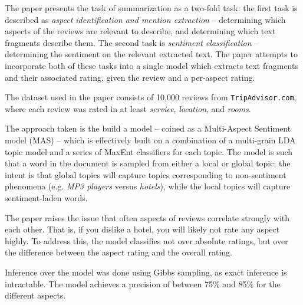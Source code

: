 \documentclass[letter,12pt]{article}
\begin{document}
The paper presents the task of summarization as a two-fold task: the first task
	is described as {\em aspect identification and mention extraction} -- determining which aspects of the
	reviews are relevant to describe, and determining which text fragments describe them.
The second task is {\em sentiment classification} -- determining the sentiment on the
	relevant extracted text.
The paper attempts to incorporate both of these tasks into a single model which extracts text fragments
	and their associated rating, given the review and a per-aspect rating.

The dataset used in the paper consists of 10,000 reviews from {\tt TripAdvisor.com}, where each
review was rated in at least {\em service}, {\em location}, and {\em rooms}.

The approach taken is the build a model -- coined as a Multi-Aspect Sentiment model (MAS) --
	which is effectively built on a combination of a multi-grain LDA topic model and a series of MaxEnt
	classifiers for each topic.
The model is such that a word in the document is sampled from either a local or global topic;
	the intent is that global topics will capture topics corresponding to non-sentiment phenomena
	(e.g. {\em MP3 players} versus {\em hotels}), while the local topics will capture sentiment-laden
	words.

The paper raises the issue that often aspects of reviews correlate strongly with each other.
That is, if you dislike a hotel, you will likely not rate any aspect highly.
To address this, the model classifies not over absolute ratings, but over the difference between
	the aspect rating and the overall rating.

Inference over the model was done using Gibbs sampling, as exact inference is intractable.
The model achieves a precision of between 75\% and 85\% for the different aspects.



\end{document}
